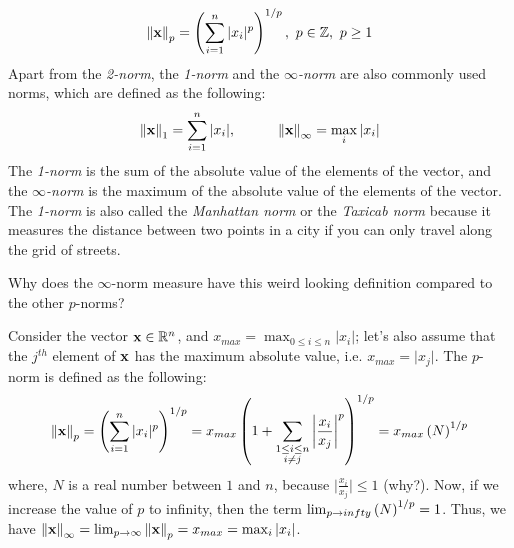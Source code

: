 \begin{equation}
    \norm{\mathbf{x}}_p = \left( \sum_{i=1}^{n} \vert x_i \vert^p \right)^{1/p}, \,\, p \in \mathbb{Z}, \,\, p \geq 1
    \label{eq:p-norm}
\end{equation}
Apart from the \textit{2-norm}, the \textit{1-norm} and the \textit{$\infty$-norm} are also commonly used norms, which are defined as the following:
\begin{equation}
    \norm{\mathbf{x}}_1 = \sum_{i=1}^{n} \vert x_i \vert, \quad \quad \quad \norm{\mathbf{x}}_{\infty} = \max_{i} \vert x_i \vert
    \label{eq:1-infinity-norm}
\end{equation}
The \textit{1-norm} is the sum of the absolute value of the elements of the vector, and the \textit{$\infty$-norm} is the maximum of the absolute value of the elements of the vector. The \textit{1-norm} is also called the \textit{Manhattan norm} or the \textit{Taxicab norm} because it measures the distance between two points in a city if you can only travel along the grid of streets.

\begin{boxedstuff}
    \begin{problem}
        Why does the $\infty$-norm measure have this weird looking definition compared to the other $p$-norms?
        \begin{solution}
            Consider the vector $\mathbf{x} \in \mathbb{R}^n$, and $x_{max} = \max_{0 \leq i \leq n} \vert x_i \vert$; let's also assume that the $j^{th}$ element of $\mathbf{x}$ has the maximum absolute value, i.e. $x_{max} = \vert x_j \vert$. The $p$-norm is defined as the following:
            \[ \begin{split} 
                \norm{\mathbf{x}}_p &= \left( \sum_{i=1}^{n} \vert x_i \vert^p \right)^{1/p} = x_{max} \left( 1 + \sum_{\substack{1 \leq i \leq n \\ i \neq j}} \left\lvert \frac{x_i}{x_j} \right\rvert^p \right)^{1/p} = x_{max}\left( N \right)^{1/p}\\
            \end{split}
            \]
            where, $N$ is a real number between $1$ and $n$, because $\vert \frac{x_i}{x_j} \vert \leq 1$ (why?). Now, if we increase the value of $p$ to infinity, then the term $\lim_{p \to infty} \left( N \right)^{1/p}= 1$. Thus, we have $\left\lVert \mathbf{x} \right\rVert_{\infty} = \lim_{p \to \infty} \left\lVert \mathbf{x} \right\rVert_p = x_{max} = \max_{i} \left\lvert x_i \right\rvert$.
        \end{solution}
    \end{problem}
\end{boxedstuff}

